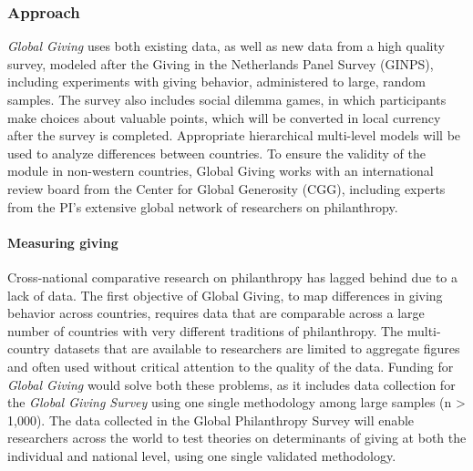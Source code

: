 \documentclass[twocolumn, serif, rga, numeric]{jote-article}
\begin{document}
 {}\subsubsection*{Approach} 

\emph{Global Giving} uses both existing data, as well as new data from a high quality survey, modeled after the Giving in the Netherlands Panel Survey (GINPS)\cite{Bekkers2006a, 100}, including experiments with giving behavior, administered to large, random samples. The survey also includes social dilemma games, in which participants make choices about valuable points, which will be converted in local currency after the survey is completed. Appropriate hierarchical multi-level models will be used to analyze differences between countries. To ensure the validity of the module in non-western countries, Global Giving works with an international review board from the Center for Global Generosity (CGG), including experts from the PI's extensive global network of researchers on philanthropy.

\paragraph{Measuring giving}

Cross-national comparative research on philanthropy has lagged behind due to a lack of data. The first objective of Global Giving, to map differences in giving behavior across countries, requires data that are comparable across a large number of countries with very different traditions of philanthropy. The multi-country datasets that are available to researchers are limited to aggregate figures and often used without critical attention to the quality of the data.\cite{Bekkers2016} Funding for \emph{Global Giving} would solve both these problems, as it includes data collection for the \emph{Global Giving Survey} using one single methodology among large samples (n \textgreater{} 1,000). The data collected in the Global Philanthropy Survey will enable researchers across the world to test theories on determinants of giving at both the individual and national level, using one single validated methodology.
\end{document}
